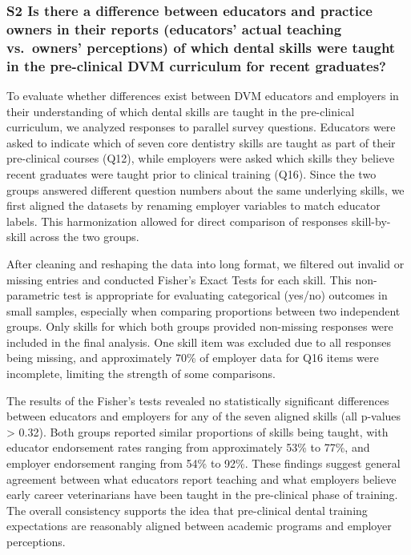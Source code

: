 \documentclass[
  11pt,
  letterpaper,
  DIV=11,
  numbers=noendperiod]{scrartcl}
\numberwithin{figure}{section}
\begin{document}
\hypertarget{s2-is-there-a-difference-between-educators-and-practice-owners-in-their-reports-educators-actual-teaching-vs.-owners-perceptions-of-which-dental-skills-were-taught-in-the-pre-clinical-dvm-curriculum-for-recent-graduates}{%
\subsubsection{S2 Is there a difference between educators and practice
owners in their reports (educators' actual teaching vs.~owners'
perceptions) of which dental skills were taught in the pre-clinical DVM
curriculum for recent
graduates?}\label{s2-is-there-a-difference-between-educators-and-practice-owners-in-their-reports-educators-actual-teaching-vs.-owners-perceptions-of-which-dental-skills-were-taught-in-the-pre-clinical-dvm-curriculum-for-recent-graduates}}

To evaluate whether differences exist between DVM educators and
employers in their understanding of which dental skills are taught in
the pre-clinical curriculum, we analyzed responses to parallel survey
questions. Educators were asked to indicate which of seven core
dentistry skills are taught as part of their pre-clinical courses (Q12),
while employers were asked which skills they believe recent graduates
were taught prior to clinical training (Q16). Since the two groups
answered different question numbers about the same underlying skills, we
first aligned the datasets by renaming employer variables to match
educator labels. This harmonization allowed for direct comparison of
responses skill-by-skill across the two groups.

After cleaning and reshaping the data into long format, we filtered out
invalid or missing entries and conducted Fisher's Exact Tests for each
skill. This non-parametric test is appropriate for evaluating
categorical (yes/no) outcomes in small samples, especially when
comparing proportions between two independent groups. Only skills for
which both groups provided non-missing responses were included in the
final analysis. One skill item was excluded due to all responses being
missing, and approximately 70\% of employer data for Q16 items were
incomplete, limiting the strength of some comparisons.

The results of the Fisher's tests revealed no statistically significant
differences between educators and employers for any of the seven aligned
skills (all p-values \textgreater{} 0.32). Both groups reported similar
proportions of skills being taught, with educator endorsement rates
ranging from approximately 53\% to 77\%, and employer endorsement
ranging from 54\% to 92\%. These findings suggest general agreement
between what educators report teaching and what employers believe early
career veterinarians have been taught in the pre-clinical phase of
training. The overall consistency supports the idea that pre-clinical
dental training expectations are reasonably aligned between academic
programs and employer perceptions.
\end{document}
